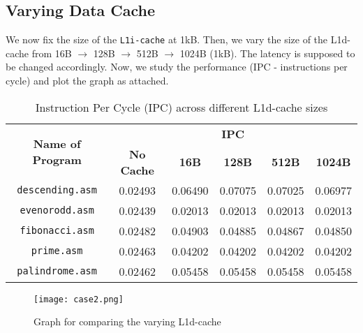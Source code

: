 \documentclass{article}
\begin{document}
\subsection{Varying Data Cache}
We now fix the size of the \texttt{L1i-cache} at 1kB. Then, we vary the size of the L1d-cache from 16B $\rightarrow$ 128B $\rightarrow$ 512B $\rightarrow$ 1024B (1kB). The latency is supposed to be changed accordingly. Now, we study the performance (IPC - instructions per cycle) and plot the graph as attached.
\begin{table}[h!]
    \centering
    \begin{tabular}{|c|c|c|c|c|c|}
        \hline
        \multirow{2}{*}{\textbf{Name of Program}} & \multicolumn{5}{c|}{\textbf{IPC}} \\
        \cline{2-6}
        & \textbf{No Cache} & \textbf{16B} & \textbf{128B} & \textbf{512B} & \textbf{1024B} \\
        \hline
        \texttt{descending.asm} & 0.02493 & 0.06490 & 0.07075 & 0.07025 & 0.06977 \\
        \hline
        \texttt{evenorodd.asm}  & 0.02439 & 0.02013 & 0.02013 & 0.02013 & 0.02013 \\
        \hline
        \texttt{fibonacci.asm}  & 0.02482 & 0.04903 & 0.04885 & 0.04867 & 0.04850 \\
        \hline
        \texttt{prime.asm}      & 0.02463 & 0.04202 & 0.04202 & 0.04202 & 0.04202 \\  %
        \hline
        \texttt{palindrome.asm} & 0.02462 & 0.05458 & 0.05458 & 0.05458 & 0.05458 \\
        \hline
    \end{tabular}
    \caption{Instruction Per Cycle (IPC) across different L1d-cache sizes}
    \label{tab:ipc_results}
\end{table}

\begin{figure}[h]
    \centering
    \texttt{[image: case2.png]}
    \caption{Graph for comparing the varying L1d-cache}
    \label{fig:graph2}
\end{figure}
\end{document}
